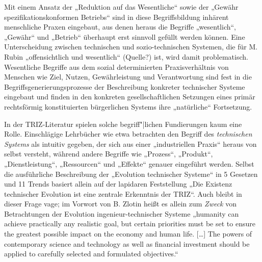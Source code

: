 \documentclass[11pt,a4paper]{article}
\begin{document}
Mit einem Ansatz der „Reduktion auf das Wesentliche“ sowie der „Gewähr
spezifikationskonformen Betriebs“ sind in diese Begriffsbildung inhärent
menschliche Praxen eingebaut, aus denen heraus die Begriffe „wesentlich“,
„Gewähr“ und „Betrieb“ überhaupt erst sinnvoll gefüllt werden können.  Eine
Unterscheidung zwischen technischen und sozio-technischen Systemen, die für
M. Rubin „offensichtlich und wesentlich“ (Quelle?) ist, wird damit
problematisch. Wesentliche Begriffe aus dem sozial determinierten
Praxisverhältnis von Menschen wie Ziel, Nutzen, Gewährleistung und
Verantwortung sind fest in die Begriffsgenerierungsprozesse der Beschreibung
konkreter technischer Systeme eingebaut und finden in den konkreten
gesellschaftlichen Setzungen eines primär rechtsförmig konstituierten
bürgerlichen Systems ihre „natürliche“ Fortsetzung.

In der TRIZ-Literatur spielen solche begriff"|lichen Fundierungen kaum eine
Rolle.  Einschlägige Lehrbücher wie etwa \cite{KoltzeSouchkov2017} betrachten
den Begriff des \emph{technischen Systems} als intuitiv gegeben, der sich aus
einer „industriellen Praxis“ heraus \cite[S. 2]{KoltzeSouchkov2017} von selbst
versteht, während andere Begriffe wie „Prozess“, „Produkt“, „Dienstleistung“,
„Ressourcen“ und „Effekte“ \cite[S. 6--10]{KoltzeSouchkov2017} genauer
eingeführt werden. Selbst die ausführliche Beschreibung der „Evolution
technischer Systeme“ in 5 Gesetzen und 11 Trends
\cite[Kap. 4.8]{KoltzeSouchkov2017} basiert allein auf der lapidaren
Feststellung „Die Existenz technischer Evolution ist eine zentrale Erkenntnis
der TRIZ“.  Auch \cite{TESE2018} bleibt in dieser Frage vage; im Vorwort von
B. Zlotin heißt es allein zum \emph{Zweck} von Betrachtungen der Evolution
ingenieur-technischer Systeme „humanity can achieve practically any realistic
goal, but certain priorities must be set to ensure the greatest possible
impact on the economy and human life. [\ldots] The powers of contemporary
science and technology as well as financial investment should be applied to
carefully selected and formulated objectives.“
\end{document}
